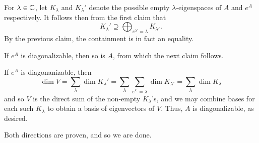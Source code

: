\documentclass{scrartcl}
\begin{document}
\begin{solution}
    For $\lambda\in \mathbb C$, let $K_\lambda$ and $K_\lambda'$ denote the possible empty $\lambda$-eigenspaces of $A$ and $e^A$ respectively. It follows then from the first claim that 
    \[K_\lambda'\supseteq\bigoplus_{e^{\lambda'}=\lambda} K_{\lambda'}.\]
    By the previous claim, the containment is in fact an equality.
    \begin{claimbox}
    If $e^A$ is diagonalizable, then so is $A$, from which the next claim follows.
    \end{claimbox}
    \begin{tproof}
    If $e^A$ is diagonanizable, then \[\dim V=\sum_\lambda \dim K_\lambda'=\sum_\lambda \sum_{e^{\lambda'}=\lambda}\dim K_{\lambda'}=\sum_{\lambda}\dim K_\lambda\] and so $V$ is the direct sum of the non-empty $K_\lambda$'s, and we may combine bases for each such $K_\lambda$ to obtain a basis of eigenvectors of $V$. Thus, $A$ is diagonalizable, as desired.
    \end{tproof}
    
    Both directions are proven, and so we are done.
    \end{solution}

\newpage
\end{document}
